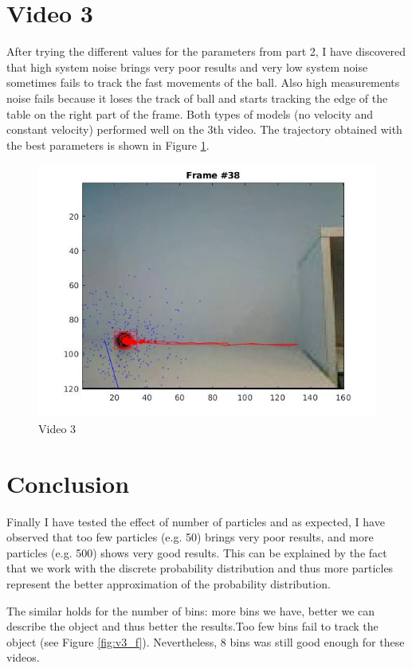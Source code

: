 \documentclass[paper=a4, fontsize=11pt]{scrartcl} %
\numberwithin{equation}{section} %
\numberwithin{figure}{section} %
\numberwithin{table}{section} %
\begin{document}
\section{Video 3}

After trying the different values for the parameters from part 2, I have discovered that high system noise brings very poor results and very low system noise sometimes fails to track the fast movements of the ball. Also high measurements noise fails because it loses the track of ball and starts tracking the edge of the table on the right part of the frame. Both types of models (no velocity and constant velocity) performed well on the 3th video. The trajectory obtained with the best parameters is shown in Figure \ref{fig:v3}.

\begin{figure}
  \centering
  \includegraphics[width=.9\linewidth]{video3.jpg}


\caption{Video 3}
\label{fig:v3}
\end{figure}


\section{Conclusion}

Finally I have tested the effect of number of particles and as expected, I have observed that too few particles (e.g. 50) brings very poor results, and more particles (e.g. 500) shows very good results. This can be explained by the fact that we work with the discrete probability distribution and thus more particles represent the better approximation of the probability distribution.

The similar holds for the number of bins: more bins we have, better we can describe the object and thus better the results.Too few bins fail to track the object (see Figure \ref{fig:v3_f}). Nevertheless, 8 bins was still good enough for these videos.
\end{document}
